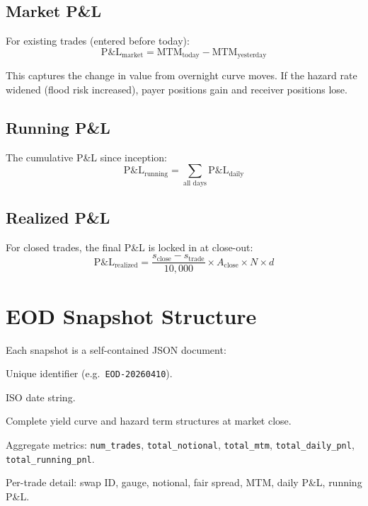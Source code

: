 \documentclass[11pt,a4paper]{article}
\begin{document}
\subsection{Market P\&L}

For existing trades (entered before today):
\[
  \text{P\&L}_{\text{market}} = \text{MTM}_{\text{today}} - \text{MTM}_{\text{yesterday}}
\]

\noindent This captures the change in value from overnight curve moves.
If the hazard rate widened (flood risk increased), payer positions gain
and receiver positions lose.

\subsection{Running P\&L}

The cumulative P\&L since inception:
\[
  \text{P\&L}_{\text{running}} = \sum_{\text{all days}} \text{P\&L}_{\text{daily}}
\]

\subsection{Realized P\&L}

For closed trades, the final P\&L is locked in at close-out:
\[
  \text{P\&L}_{\text{realized}} = \frac{s_{\text{close}} - s_{\text{trade}}}{10{,}000}
      \times A_{\text{close}} \times N \times d
\]


\section{EOD Snapshot Structure}

Each snapshot is a self-contained JSON document:

\begin{description}[leftmargin=2em]
  \item[\texttt{eod\_id}] Unique identifier (e.g.\ \texttt{EOD-20260410}).
  \item[\texttt{date}] ISO date string.
  \item[\texttt{market\_state\_snapshot}] Complete yield curve and
        hazard term structures at market close.
  \item[\texttt{portfolio\_summary}] Aggregate metrics:
        \texttt{num\_trades}, \texttt{total\_notional},
        \texttt{total\_mtm}, \texttt{total\_daily\_pnl},
        \texttt{total\_running\_pnl}.
  \item[\texttt{positions}] Per-trade detail: swap ID, gauge, notional,
        fair spread, MTM, daily P\&L, running P\&L.
\end{description}
\end{document}
